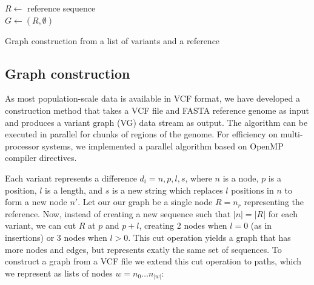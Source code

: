 \documentclass{article}
\begin{document}
\begin{algorithm}[h!]
  $R \gets $ reference sequence \\
  $G \gets ( R, \emptyset )$ \\
  \caption{
\label{alg:construct}
Graph construction from a list of variants and a reference}
\end{algorithm}



\subsection{Graph construction}

As most population-scale data is available in VCF format, we have developed a construction method that takes a VCF file and FASTA reference genome as input and produces a variant graph (VG) data stream as output.
The algorithm can be executed in parallel for chunks of regions of the genome. For efficiency on multi-processor systems, we implemented a parallel algorithm based on OpenMP compiler directives.

Each variant represents a difference $d_i = { n, p, l, s }$, where $n$ is a node, $p$ is a position, $l$ is a length, and $s$ is a new string which replaces $l$ positions in $n$ to form a new node $n'$.
Let our our graph be a single node $R = n_r$ representing the reference.
Now, instead of creating a new sequence such that $|n| = |R|$ for each variant, we can cut $R$ at $p$ and $p+l$, creating 2 nodes when $l = 0$ (as in insertions) or 3 nodes when $l > 0$.
This cut operation yields a graph that has more nodes and edges, but represents exatly the same set of sequences.
To construct a graph from a VCF file we extend this cut operation to paths, which we represent as lists of nodes $w = n_0 \ldots n_{|w|}$:
\end{document}
